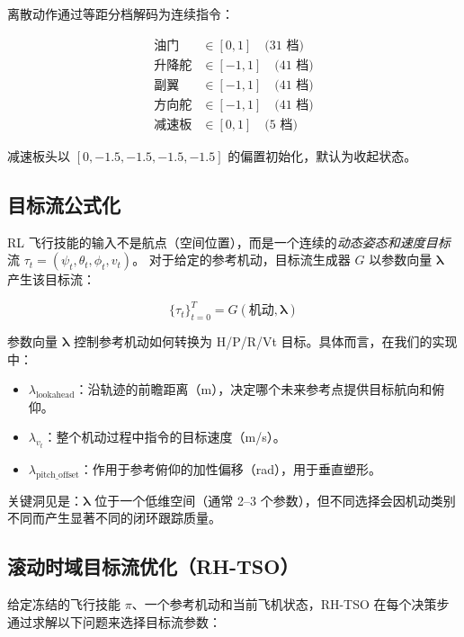 \documentclass{article}
\begin{document}
离散动作通过等距分档解码为连续指令：

\begin{align}
  \text{油门} &\in [0, 1] \quad \text{(31 档)} \\
  \text{升降舵} &\in [-1, 1] \quad \text{(41 档)} \\
  \text{副翼}  &\in [-1, 1] \quad \text{(41 档)} \\
  \text{方向舵}   &\in [-1, 1] \quad \text{(41 档)} \\
  \text{减速板} &\in [0, 1] \quad \text{(5 档)}
\end{align}

减速板头以 $[0, -1.5, -1.5, -1.5, -1.5]$ 的偏置初始化，默认为收起状态。

\subsection{目标流公式化}

RL 飞行技能的输入不是航点（空间位置），而是一个连续的\emph{动态姿态和速度目标}流 $\tau_t = (\psi_t, \theta_t, \phi_t, v_t)$。
对于给定的参考机动，目标流生成器 $G$ 以参数向量 $\bm{\lambda}$ 产生该目标流：

\begin{equation}
  \{\tau_t\}_{t=0}^{T} = G(\text{机动}, \bm{\lambda})
\end{equation}

参数向量 $\bm{\lambda}$ 控制参考机动如何转换为 H/P/R/Vt 目标。具体而言，在我们的实现中：

\begin{itemize}
  \item $\lambda_{\text{lookahead}}$：沿轨迹的前瞻距离（m），决定哪个未来参考点提供目标航向和俯仰。
  \item $\lambda_{v_t}$：整个机动过程中指令的目标速度（m/s）。
  \item $\lambda_{\text{pitch\_offset}}$：作用于参考俯仰的加性偏移（rad），用于垂直塑形。
\end{itemize}

关键洞见是：$\bm{\lambda}$ 位于一个低维空间（通常 2--3 个参数），但不同选择会因机动类别不同而产生显著不同的闭环跟踪质量。

\subsection{滚动时域目标流优化（RH-TSO）}

给定冻结的飞行技能 $\pi$、一个参考机动和当前飞机状态，RH-TSO 在每个决策步通过求解以下问题来选择目标流参数：
\end{document}
